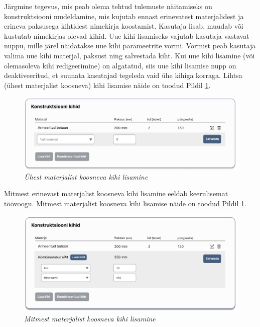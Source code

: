 Järgmine tegevus, mis peab olema tehtud tulemuste näitamiseks on konstruktsiooni mudeldamine, mis
kujutab ennast erinevatest materjalidest ja erineva paksusega kihtidest nimekirja koostamist.
Kasutaja lisab, muudab või kustutab nimekirjas olevad kihid. Uue kihi lisamiseks vajutab kasutaja
vastavat nuppu, mille järel näidatakse uue kihi parameetrite vormi. Vormist peab kasutaja
valima uue kihi materjal, paksust ning salvestada kiht. Kui uue kihi lisamine (või
olemasoleva kihi redigeerimine) on algatatud, siis uue kihi lisamise nupp on deaktiveeritud, et
suunata kasutajad tegeleda vaid ühe kihiga korraga. Lihtsa (ühest materjalist koosneva) kihi lisamise näide
on toodud Pildil \ref{fig:design_simple_layer}.
\begin{figure}[ht]
    \centering
    \includegraphics[width=1\textwidth]{figures/analysis/desing_calc_simple_layer.png}
    \caption[Ühest materjalist koosneva kihi lisamine]{\textit{Ühest materjalist koosneva kihi lisamine}}
    \label{fig:design_simple_layer}
\end{figure}

Mitmest erinevast materjalist koosneva kihi lisamine eeldab keerulisemat töövoogu. 
Mitmest materjalist koosneva kihi lisamise näide on toodud Pildil \ref{fig:design_simple_layer}.
\begin{figure}[ht]
    \centering
    \includegraphics[width=1\textwidth]{figures/analysis/desing_calc_multi_layer.png}
    \caption[Mitmest materjalist koosneva kihi lisamine]{\textit{Mitmest materjalist koosneva kihi lisamine}}
    \label{fig:design_multy_layer}
\end{figure}